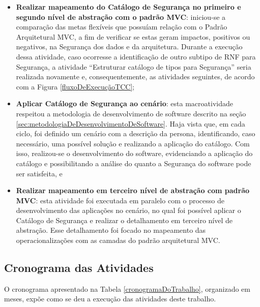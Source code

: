 \begin{itemize}
	\item \textbf{Realizar mapeamento do Catálogo de Segurança no primeiro e segundo nível de abstração com o padrão MVC}: iniciou-se a comparação das metas flexíveis que possuíam relação com o Padrão Arquitetural MVC, a fim de verificar se estas geram impactos, positivos ou negativos, na Segurança dos dados e da arquitetura. Durante a execução dessa atividade, caso ocorresse a identificação de outro subtipo de RNF para Segurança, a atividade “Estruturar catálogo de tipos para Segurança” seria realizada novamente e, consequentemente, as atividades seguintes, de acordo com a Figura \ref{fluxoDeExecuçãoTCC};
	
	\item \textbf{Aplicar Catálogo de Segurança ao cenário}: esta macroatividade respeitou a metodologia de desenvolvimento de software descrito na seção \ref{sec:metodologiaDeDesenvolvimentoDeSoftware}. Haja vista que, em cada ciclo, foi definido um cenário com a descrição da persona, identificando, caso necessário, uma possível solução e realizando a aplicação do catálogo. Com isso, realizou-se o desenvolvimento do software, evidenciando a aplicação do catálogo e possibilitando a análise do quanto a Segurança do software pode ser satisfeita, e
	
	\item  \textbf{Realizar mapeamento em terceiro nível de abstração com padrão MVC}: esta atividade foi executada em paralelo com o processo de desenvolvimento das aplicações no cenário, no qual foi possível aplicar o Catálogo de Segurança e realizar o detalhamento em terceiro nível de abstração. Esse detalhamento foi focado no mapeamento das operacionalizações com as camadas do padrão arquitetural MVC. 
\end{itemize}


\subsection{Cronograma das Atividades}


O cronograma apresentado na Tabela \ref{cronogramaDoTrabalho}, organizado em meses, expõe como se deu a execução das atividades deste trabalho.

